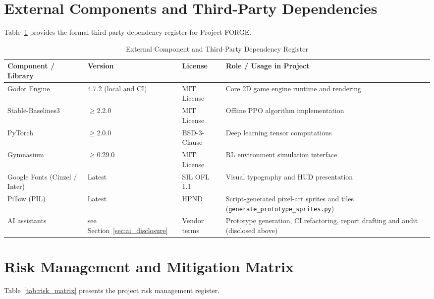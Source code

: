 \section{External Components and Third-Party Dependencies}
Table~\ref{tab:dependencies} provides the formal third-party dependency register for Project FORGE.

\begin{table}[!htbp]
\centering
\caption{External Component and Third-Party Dependency Register}
\label{tab:dependencies}
\small
\begin{tabular}{p{}p{}p{}p{}}
\toprule
\textbf{Component / Library} & \textbf{Version} & \textbf{License} & \textbf{Role / Usage in Project} \\
\midrule
Godot Engine & 4.7.2 (local and CI) & MIT License & Core 2D game engine runtime and rendering \\
Stable-Baselines3 & $\ge 2.2.0$ & MIT License & Offline PPO algorithm implementation \\
PyTorch & $\ge 2.0.0$ & BSD-3-Clause & Deep learning tensor computations \\
Gymnasium & $\ge 0.29.0$ & MIT License & RL environment simulation interface \\
Google Fonts (Cinzel / Inter) & Latest & SIL OFL 1.1 & Visual typography and HUD presentation \\
Pillow (PIL) & Latest & HPND & Script-generated pixel-art sprites and tiles (\texttt{generate\_prototype\_sprites.py}) \\
AI assistants & see Section~\ref{sec:ai_disclosure} & Vendor terms & Prototype generation, CI refactoring, report drafting and audit (disclosed above) \\
\bottomrule
\end{tabular}
\end{table}

\section{Risk Management and Mitigation Matrix}
\label{sec:risk}
Table~\ref{tab:risk_matrix} presents the project risk management register.

